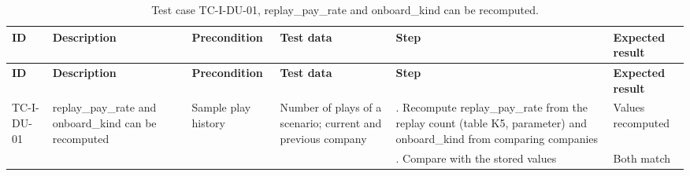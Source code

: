 {\footnotesize{}\renewcommand{\arraystretch}{1.1}
\begin{longtable}{|>{\raggedright\arraybackslash}p{}|>{\raggedright\arraybackslash}p{}|>{\raggedright\arraybackslash}p{}|>{\raggedright\arraybackslash}p{}|>{\raggedright\arraybackslash}p{}|>{\raggedright\arraybackslash}p{}|}
\caption{Test case TC-I-DU-01, replay\_\allowbreak{}pay\_\allowbreak{}rate and onboard\_\allowbreak{}kind can be recomputed.} \\
\hline
\textbf{ID} & \textbf{Description} & \textbf{Precondition} & \textbf{Test data} & \textbf{Step} & \textbf{Expected result} \\ \hline
\endfirsthead
\hline
\textbf{ID} & \textbf{Description} & \textbf{Precondition} & \textbf{Test data} & \textbf{Step} & \textbf{Expected result} \\ \hline
\endhead
TC-I-DU-01 & replay\_\allowbreak{}pay\_\allowbreak{}rate and onboard\_\allowbreak{}kind can be recomputed & Sample play history & Number of plays of a scenario; current and previous company & 1. Recompute replay\_\allowbreak{}pay\_\allowbreak{}rate from the replay count (table K5, parameter) and onboard\_\allowbreak{}kind from comparing companies & Values recomputed \\ \cline{5-6}
 &  &  &  & 2. Compare with the stored values & Both match \\ \hline
\end{longtable}
}

